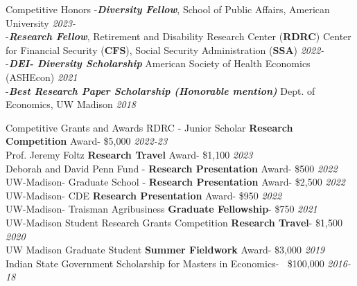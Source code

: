\documentclass{resume} %
\begin{document}


\begin{rSection}{Competitive Honors}
-\textbf{\textit{Diversity Fellow}}, School of Public Affairs, American University \hfill \textit{2023-} \\
-\textbf{\textit{Research Fellow}}, Retirement and Disability Research Center (\textbf{RDRC}) Center for Financial Security (\textbf{CFS}), Social Security Administration (\textbf{SSA})  \hfill \textit{2022-} \\
-\textbf{\textit{DEI- Diversity Scholarship}} American Society of Health Economics (ASHEcon) \hfill \textit{2021} \\
-\textbf{\textit{Best Research Paper Scholarship (Honorable mention)}} Dept. of Economics, UW Madison \hfill \textit{2018}
\end{rSection}




\begin{rSection}{Competitive Grants and Awards}
RDRC - Junior Scholar \textbf{Research Competition} Award- \$5,000 \hfill \textit{2022-23}	\\
Prof. Jeremy Foltz \textbf{Research Travel} Award- \$1,100 \hfill \textit{2023}	\\
Deborah and David Penn Fund - \textbf{Research Presentation} Award- \$500 \hfill \textit{2022}	\\
UW-Madison- Graduate School - \textbf{Research Presentation} Award- \$2,500 \hfill \textit{2022}	\\
UW-Madison- CDE \textbf{Research Presentation} Award- \$950 \hfill \textit{2022} \\
UW-Madison- Traisman Agribusiness \textbf{Graduate Fellowship}- \$750 \hfill \textit{2021}	\\
UW-Madison Student Research Grants Competition \textbf{Research Travel}- \$1,500 \hfill \textit{2020}  \\
UW Madison Graduate Student \textbf{Summer Fieldwork} Award- \$3,000  \hfill \textit{2019}\\
Indian State Government Scholarship for Masters in Economics- $~$ \$100,000 \hfill \textit{2016-18}

\end{rSection}
\end{document}
